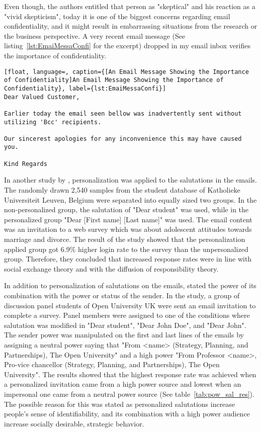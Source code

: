 Even though, the authors entitled that person as "skeptical" and his reaction as a "vivid skepticism", today it is one of the biggest concerns regarding email confidentiality, and it might result in embarrassing situations from the research or the business perspective. A very recent email message (See listing~\ref{lst:EmaiMessaConfi} for the excerpt) dropped in my email inbox verifies the importance of confidentiality.  
\vspace{1cm}

\begin{lstlisting}[float, language=, caption={[An Email Message Showing the Importance of Confidentiality]An Email Message Showing the Importance of Confidentiality}, label={lst:EmaiMessaConfi}]
Dear Valued Customer,

Earlier today the email seen bellow was inadvertently sent without utilizing 'Bcc' recipients.

Our sincerest apologies for any inconvenience this may have caused you.

Kind Regards
\end{lstlisting}

In another study by \cite{Heerwegh2005}, personalization was applied to the salutations in the emails. The randomly drawn 2,540 samples from the student database of Katholieke Universiteit Leuven, Belgium were separated into equally sized two groups. In the non-personalized group, the salutation of "Dear student" was used, while in the personalized group "Dear [First name] [Last name]" was used. The email content was an invitation to a web survey which was about adolescent attitudes towards marriage and divorce. The result of the study showed that the personalization applied group got 6.9\% higher login rate to the survey than the unpersonalized group. Therefore, they concluded that increased response rates were in line with social exchange theory and with the diffusion of responsibility theory.
\vspace{1cm}

In addition to personalization of salutations on the emails, \cite{Joinson2007} stated the power of its combination with the power or status of the sender. In the study, a group of discussion panel students of Open University UK were sent an email invitation to complete a survey. Panel members were assigned to one of the conditions where salutation was modified in "Dear student", "Dear John Doe", and "Dear John". The sender power was manipulated on the first and last lines of the emails by assigning a neutral power saying that "From <name> (Strategy, Planning, and Partnerships), The Open University" and a high power "From Professor <name>, Pro-vice chancellor (Strategy, Planning, and Partnerships), The Open University". The results showed that the highest response rate was achieved when a personalized invitation came from a high power source and lowest when an impersonal one came from a neutral power source (See table~\ref{tab:pow_sal_res}). The possible reason for this was stated as personalized salutations increase people's sense of identifiability,  and its combination with a high power audience increase socially desirable, strategic behavior.

